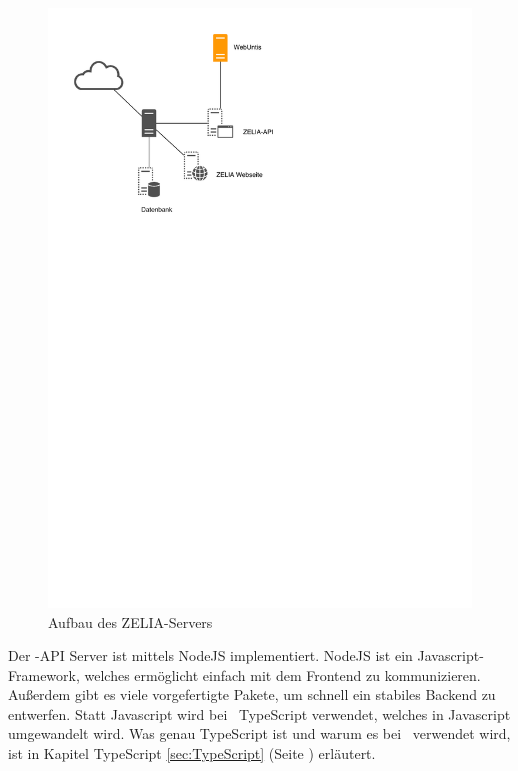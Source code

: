\begin{figure}[H]
    \centering
    \includegraphics[width=120mm]{./media/Intro/server_arch.svg.pdf}
    \caption{Aufbau des ZELIA-Servers}
    \label{fig:server_arch}
\end{figure}

Der \ZELIA-API Server ist mittels NodeJS implementiert. NodeJS ist ein Javascript-Framework, welches ermöglicht einfach mit dem Frontend zu kommunizieren. Außerdem gibt es viele vorgefertigte Pakete, um schnell ein stabiles Backend zu entwerfen. Statt Javascript wird bei \ZELIA\  TypeScript verwendet, welches in Javascript umgewandelt wird. Was genau TypeScript ist und warum es bei \ZELIA\ verwendet wird, ist in Kapitel TypeScript \ref{sec:TypeScript} (Seite \pageref{sec:TypeScript}) erläutert.


